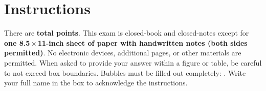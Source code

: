 \vspace*{-0.65in}
\section*{Instructions}
\vspace*{-0.1in}
There are {\bf
{} total points}.
This exam is closed-book and closed-notes except for {\bf one
8.5\,$\times$\,11-inch sheet of paper with handwritten notes (both sides
permitted)}. No electronic devices, additional pages, or other materials are
permitted.
When asked to provide your answer within a figure or table, be careful to not
exceed box boundaries. Bubbles must be filled out completely:
 .
Write your full name in the box to acknowledge the instructions.

